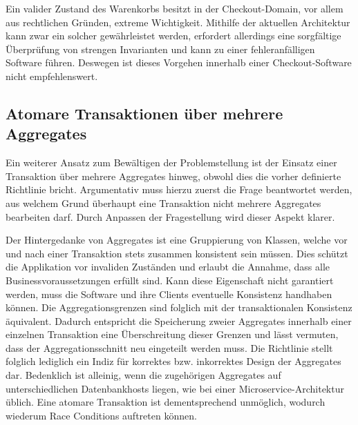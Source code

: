Ein valider Zustand des Warenkorbs besitzt in der Checkout-Domain, vor allem aus rechtlichen Gründen, extreme Wichtigkeit. Mithilfe der aktuellen Architektur kann zwar ein solcher gewährleistet werden, erfordert allerdings eine sorgfältige Überprüfung von strengen Invarianten und kann zu einer fehleranfälligen Software führen. Deswegen ist dieses Vorgehen innerhalb einer Checkout-Software nicht empfehlenswert.

\subsection{Atomare Transaktionen über mehrere Aggregates}

Ein weiterer Ansatz zum Bewältigen der Problemstellung ist der Einsatz einer Transaktion über mehrere Aggregates hinweg, obwohl dies die vorher definierte Richtlinie bricht. Argumentativ muss hierzu zuerst die Frage beantwortet werden, aus welchem Grund überhaupt eine Transaktion nicht mehrere Aggregates bearbeiten darf. Durch Anpassen der Fragestellung wird dieser Aspekt klarer. 

Der Hintergedanke von Aggregates ist eine Gruppierung von Klassen, welche vor und nach einer Transaktion stets zusammen konsistent sein müssen. Dies schützt die Applikation vor invaliden Zuständen und erlaubt die Annahme, dass alle Businessvoraussetzungen erfüllt sind. Kann diese Eigenschaft nicht garantiert werden, muss die Software und ihre Clients eventuelle Konsistenz handhaben können. Die Aggregationsgrenzen sind folglich mit der transaktionalen Konsistenz äquivalent. Dadurch entspricht die Speicherung zweier Aggregates innerhalb einer einzelnen Transaktion eine Überschreitung dieser Grenzen und lässt vermuten, dass der Aggregationsschnitt neu eingeteilt werden muss. Die Richtlinie stellt folglich lediglich ein Indiz für korrektes bzw. inkorrektes Design der Aggregates dar. Bedenklich ist alleinig, wenn die zugehörigen Aggregates auf unterschiedlichen Datenbankhosts liegen, wie bei einer Microservice-Architektur üblich. Eine atomare Transaktion ist dementsprechend unmöglich, wodurch wiederum Race Conditions auftreten können.

